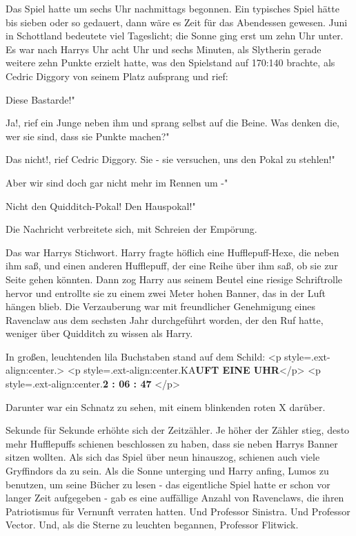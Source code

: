 Das Spiel hatte um sechs Uhr nachmittags begonnen. Ein typisches Spiel hätte bis
sieben oder so gedauert, dann wäre es Zeit für das Abendessen gewesen. Juni in
Schottland bedeutete viel Tageslicht; die Sonne ging erst um zehn Uhr unter. Es
war nach Harrys Uhr acht Uhr und sechs Minuten, als Slytherin gerade weitere
zehn Punkte erzielt hatte, was den Spielstand auf 170:140 brachte, als Cedric
Diggory von seinem Platz aufsprang und rief:

\glqq Diese Bastarde!"

\glqq Ja!\grqq{}, rief ein Junge neben ihm und sprang selbst auf die Beine.
\glqq Was denken die, wer sie sind, dass sie Punkte machen?"

\glqq Das nicht!\grqq{}, rief Cedric Diggory. \glqq Sie - sie versuchen, uns den
Pokal zu stehlen!"

\glqq Aber wir sind doch gar nicht mehr im Rennen um -"

\glqq Nicht den Quidditch-Pokal! Den Hauspokal!"

Die Nachricht verbreitete sich, mit Schreien der Empörung.

Das war Harrys Stichwort. Harry fragte höflich eine Hufflepuff-Hexe, die neben
ihm saß, und einen anderen Hufflepuff, der eine Reihe über ihm saß, ob sie zur
Seite gehen könnten. Dann zog Harry aus seinem Beutel eine riesige Schriftrolle
hervor und entrollte sie zu einem zwei Meter hohen Banner, das in der Luft
hängen blieb. Die Verzauberung war mit freundlicher Genehmigung eines Ravenclaw
aus dem sechsten Jahr durchgeführt worden, der den Ruf hatte, weniger über
Quidditch zu wissen als Harry.

In großen, leuchtenden lila Buchstaben stand auf dem Schild: <p
style=\grqq{}.ext-align:center\grqq{}.> <p
style=\grqq{}.ext-align:center\grqq{}.KA\textbf{UFT EINE UHR}</p> <p
style=\grqq{}.ext-align:center\grqq{}.\textbf{2 : 06 : 47 }</p>

Darunter war ein Schnatz zu sehen, mit einem blinkenden roten X darüber.

Sekunde für Sekunde erhöhte sich der Zeitzähler. Je höher der Zähler stieg,
desto mehr Hufflepuffs schienen beschlossen zu haben, dass sie neben Harrys
Banner sitzen wollten. Als sich das Spiel über neun hinauszog, schienen auch
viele Gryffindors da zu sein. Als die Sonne unterging und Harry anfing, Lumos zu
benutzen, um seine Bücher zu lesen - das eigentliche Spiel hatte er schon vor
langer Zeit aufgegeben - gab es eine auffällige Anzahl von Ravenclaws, die ihren
Patriotismus für Vernunft verraten hatten. Und Professor Sinistra. Und Professor
Vector. Und, als die Sterne zu leuchten begannen, Professor Flitwick.

